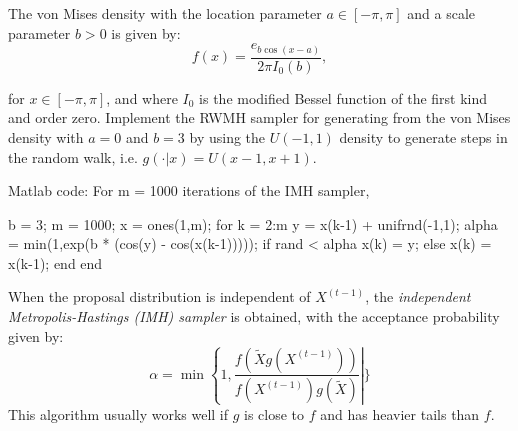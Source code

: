 \begin{example}
The von Mises density with the location parameter $a\in[-\pi,\pi]$ and a scale parameter $b > 0$ is given by:
\begin{equation}
f(x)=\frac{e_{b\cos(x-a)}}{2\pi I_0(b)},
\end{equation}

for $x\in[-\pi ,\pi]$, and where $I_0$ is the modified Bessel function of the first kind and order zero. Implement the RWMH sampler for generating from the von Mises density with $a = 0$ and $b = 3$ by using the $U(-1, 1)$ density to generate steps in the random walk, i.e. $g(\cdot|x)=U(x-1,x+1)$.

Matlab code: For m = 1000 iterations of the IMH sampler,
\begin{VrbM}
b = 3;
m = 1000;
x = ones(1,m); %
for k = 2:m
	y = x(k-1) + unifrnd(-1,1); %
   	alpha = min(1,exp(b * (cos(y) - cos(x(k-1)))));
	if rand < alpha
		x(k) = y;
	else
		x(k) = x(k-1);
	end %
end %
\end{VrbM}
\end{example}

When the proposal distribution is independent of $X^{(t-1)}$, the {\it independent Metropolis-Hastings (IMH) sampler} is obtained, with the acceptance probability given by:
\begin{equation}
\alpha=\min\left\{ 1,\frac{f(\tilde{X}g(X^{(t-1)}))}{f(X^{(t-1)})g(\tilde{X})}\right|\}
\end{equation}
This algorithm usually works well if $g$ is close to $f$ and has heavier tails than $f$.

